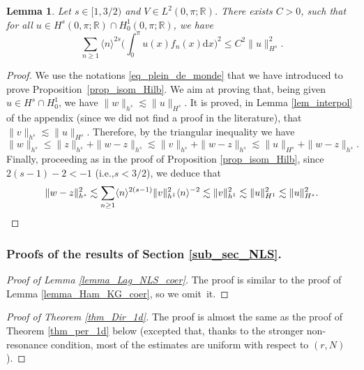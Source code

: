 \documentclass[11pt]{article}
\newcommand{\ie}{i.e.,\xspace}
\newcommand{\Subsubsection}{\subsubsection}
\newtheorem{lemma}[theorem]{Lemma}
\theoremstyle{definition}
\begin{document}
\begin{lemma}
\label{lem_inter_fn}
Let $s \in [1,3/2)$ and $V\in L^2(0,\pi;\mathbb{R})$. There exists $C>0$, such that for all $u\in H^{s}(0,\pi;\mathbb{R}) \cap H^1_0(0,\pi;\mathbb{R})$, we have
\[
\sum_{n\geq 1} \langle n \rangle^{2s} \biggl(\int_0^\pi u(x) f_n(x) \mathrm{d}x \biggr)^2 \leq C^2 \|u\|_{H^{s}}^2.
\]
\end{lemma}
\begin{proof} We use the notations \eqref{eq_plein_de_monde} that we have introduced to prove Proposition~\ref{prop_isom_Hilb}.
We aim at proving that, being given $u\in H^{s} \cap H^1_0$, we have $\| w\|_{h^{s}} \lesssim \| u \|_{H^s}$. It is proved, in Lemma \ref{lem_interpol} of the appendix (since we did not find a proof in the literature), that
$\| v \|_{h^s} \lesssim \| u\|_{H^s}$. Therefore, by the triangular inequality we have
\[
\| w\|_{h^{s}} \leq \| z \|_{h^{s}} + \|w - z \|_{h^{s}} \lesssim \| v \|_{h^{s}}+ \|w - z \|_{h^{s}} \lesssim \| u \|_{H^s} + \|w - z \|_{h^{s}}.
\]
Finally, proceeding as in the proof of Proposition \ref{prop_isom_Hilb}, since $2(s-1)-2<-1$ (\ie $s<3/2$), we deduce that
\[
\|w - z \|_{h^{s}}^2 \lesssim \sum_{n\geq 1} \langle n \rangle^{2(s-1)} \| v\|_{h^1}^2 \langle n \rangle^{-2} \lesssim \| v\|_{h^1}^2 \lesssim \| u\|_{H^1}^2 \lesssim \| u\|_{H^s}^2.\qedhere
\]
\end{proof}

\Subsubsection{Proofs of the results of Section \ref{sub_sec_NLS}.}

\begin{proof}[Proof of Lemma \ref{lemma_Lag_NLS_coer}] The proof is similar to the proof of Lemma \ref{lemma_Ham_KG_coer}, so we omit~it.
\end{proof}

\begin{proof}[Proof of Theorem \ref{thm_Dir_1d}] The proof is almost the same as the proof of Theorem \ref{thm_per_1d} below (excepted that, thanks to the stronger non-resonance condition, most of the estimates are uniform with respect to $(r,N)$).
\end{proof}
\end{document}
